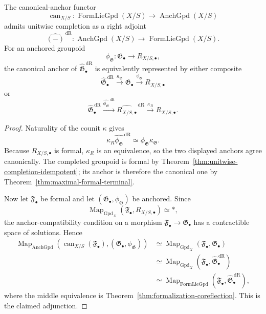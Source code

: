 \begin{proposition}
\label{prop:anchored-formal-coreflection}
The canonical-anchor functor
\[
    \operatorname{can}_{X/S}:
    \operatorname{FormLieGpd}(X/S)
    \longrightarrow
    \operatorname{AnchGpd}(X/S)
\]
admits unitwise completion as a right adjoint
\[
    \widehat{(-)}^{\,\mathrm{dR}}:
    \operatorname{AnchGpd}(X/S)
    \longrightarrow
    \operatorname{FormLieGpd}(X/S).
\]
For an anchored groupoid
\[
    \phi_{\mathfrak G}:
    \mathfrak G_\bullet\to R_{X/S,\bullet},
\]
the canonical anchor of
$\widehat{\mathfrak G}^{\,\mathrm{dR}}_\bullet$ is equivalently represented by
either composite
\[
    \widehat{\mathfrak G}^{\,\mathrm{dR}}_\bullet
    \xrightarrow{\kappa_{\mathfrak G}}
    \mathfrak G_\bullet
    \xrightarrow{\phi_{\mathfrak G}}
    R_{X/S,\bullet}
\]
or
\[
    \widehat{\mathfrak G}^{\,\mathrm{dR}}_\bullet
    \xrightarrow{\widehat{\phi_{\mathfrak G}}^{\,\mathrm{dR}}}
    \widehat{R_{X/S,\bullet}}^{\,\mathrm{dR}}
    \xrightarrow{\kappa_{R}}
    R_{X/S,\bullet}.
\]
\end{proposition}

\begin{proof}
Naturality of the counit $\kappa$ gives
\[
    \kappa_R
    \widehat{\phi_{\mathfrak G}}^{\,\mathrm{dR}}
    \simeq
    \phi_{\mathfrak G}\kappa_{\mathfrak G}.
\]
Because $R_{X/S,\bullet}$ is formal, $\kappa_R$ is an equivalence, so the two
displayed anchors agree canonically.  The completed groupoid is formal by
Theorem~\ref{thm:unitwise-completion-idempotent}; its anchor is therefore the
canonical one by Theorem~\ref{thm:maximal-formal-terminal}.

Now let $\mathfrak F_\bullet$ be formal and let
$(\mathfrak G_\bullet,\phi_{\mathfrak G})$ be anchored.  Since
\[
    \operatorname{Map}_{\operatorname{Gpd}_X}
    \left(
        \mathfrak F_\bullet,
        R_{X/S,\bullet}
    \right)
    \simeq *,
\]
the anchor-compatibility condition on a morphism
$\mathfrak F_\bullet\to\mathfrak G_\bullet$ has a contractible space of
solutions.  Hence
\[
\begin{aligned}
    \operatorname{Map}_{\operatorname{AnchGpd}}
    \left(
        \operatorname{can}_{X/S}(\mathfrak F_\bullet),
        (\mathfrak G_\bullet,\phi_{\mathfrak G})
    \right)
    &\simeq
    \operatorname{Map}_{\operatorname{Gpd}_X}
    \left(
        \mathfrak F_\bullet,
        \mathfrak G_\bullet
    \right)\\
    &\simeq
    \operatorname{Map}_{\operatorname{Gpd}_X}
    \left(
        \mathfrak F_\bullet,
        \widehat{\mathfrak G}^{\,\mathrm{dR}}_\bullet
    \right)\\
    &\simeq
    \operatorname{Map}_{\operatorname{FormLieGpd}}
    \left(
        \mathfrak F_\bullet,
        \widehat{\mathfrak G}^{\,\mathrm{dR}}_\bullet
    \right),
\end{aligned}
\]
where the middle equivalence is
Theorem~\ref{thm:formalization-coreflection}.  This is the claimed adjunction.
\end{proof}

